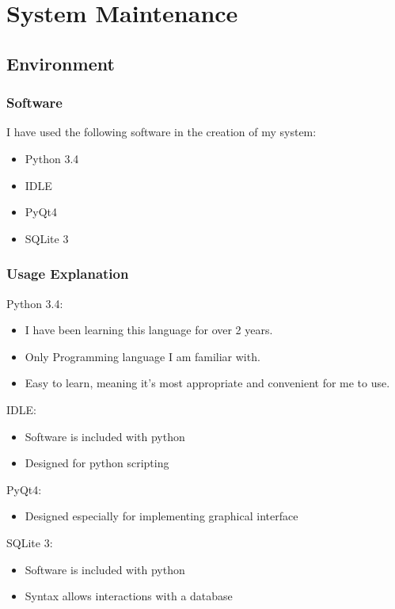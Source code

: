 \chapter{System Maintenance}

\section{Environment}

\subsection{Software}

I have used the following software in the creation of my system:

\begin{itemize}
    \item Python 3.4
    \item IDLE
    \item PyQt4
    \item SQLite 3
\end{itemize}

\subsection{Usage Explanation}

Python 3.4:
\begin{itemize}
    \item I have been learning this language for over 2 years.
    \item Only Programming language I am familiar with.
    \item Easy to learn, meaning it's most appropriate and convenient for me to use.
\end{itemize}


IDLE:
\begin{itemize}
    \item Software is included with python
    \item Designed for python scripting
\end{itemize}


PyQt4:
\begin{itemize}
    \item Designed especially for implementing graphical interface
\end{itemize}

SQLite 3:
\begin{itemize}
    \item Software is included with python
    \item Syntax allows interactions with a database
\end{itemize}



